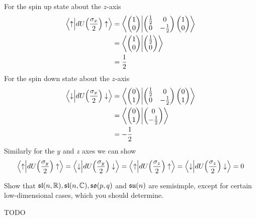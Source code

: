 \documentclass[10pt]{article}
\begin{document}
For the spin up state about the $z$-axis
$$
\begin{aligned}
	\ip{\uparrow}{dU\p*{\frac{\sigma_x}{2}}\uparrow} &= \ip{\begin{pmatrix}
		1\\0
	\end{pmatrix}}{\begin{pmatrix}
		\frac12&0\\0&-\frac12
	\end{pmatrix}\begin{pmatrix}
		1\\0
	\end{pmatrix}}\\
	&= \ip{\begin{pmatrix}
		1\\0
	\end{pmatrix}}{\begin{pmatrix}
		\frac12\\0
	\end{pmatrix}}\\
	&= \frac12
\end{aligned}
$$
For the spin down state about the $z$-axis
$$
\begin{aligned}
	\ip{\downarrow}{dU\p*{\frac{\sigma_x}{2}}\downarrow} &= \ip{\begin{pmatrix}
		0\\1
	\end{pmatrix}}{\begin{pmatrix}
		\frac12&0\\0&-\frac12
	\end{pmatrix}\begin{pmatrix}
		0\\1
	\end{pmatrix}}\\
	&= \ip{\begin{pmatrix}
		0\\1
	\end{pmatrix}}{\begin{pmatrix}
		0\\-\frac12
	\end{pmatrix}}\\
	&= -\frac12
\end{aligned}
$$
Similarly for the $y$ and $z$ axes we can show
$$
\ip{\uparrow}{dU\p*{\frac{\sigma_y}{2}}\uparrow} = \ip{\downarrow}{dU\p*{\frac{\sigma_y}{2}}\downarrow} = \ip{\uparrow}{dU\p*{\frac{\sigma_z}{2}}\uparrow} = \ip{\downarrow}{dU\p*{\frac{\sigma_z}{2}}\downarrow} = 0
$$


\begin{example}
	Show that $\mathfrak{sl}(n,\mathbb{R}), \mathfrak{sl}(n,\mathbb{C}), \mathfrak{so}(p,q)$ and $\mathfrak{su}(n)$ are semisimple, except for certain low-dimensional cases, which you should determine.
\end{example}
\sol TODO
\end{document}
